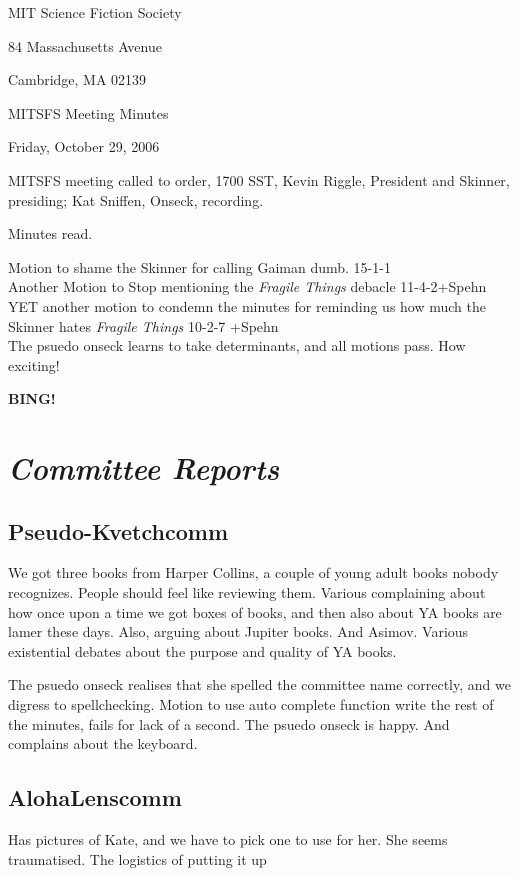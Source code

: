 \documentclass[10pt]{article}
\newcommand{\bing}{{\bf BING!} }
\newcommand{\goto}[1]{\bing \vskip 12pt \section*{{\em{#1}}}}
\begin{document}
\begin{center}

MIT Science Fiction Society

84 Massachusetts Avenue

Cambridge, MA 02139

\vspace{12pt}

MITSFS Meeting Minutes

Friday, October 29, 2006

\end{center}

\vspace{18pt}

\setlength{\parskip}{6pt}

\noindent
MITSFS meeting called to order, 1700 SST,
Kevin Riggle, President and Skinner, presiding; Kat Sniffen, Onseck, recording.

Minutes read.


Motion to shame the Skinner for calling Gaiman dumb.  15-1-1\\
Another Motion to Stop mentioning the \emph{Fragile Things} debacle 11-4-2+Spehn \\
YET another motion to condemn the minutes for reminding us how much the Skinner hates \emph{Fragile Things} 10-2-7 +Spehn \\
The psuedo onseck learns to take determinants, and all motions pass. How exciting!


\goto{Committee Reports}

\subsection*{Pseudo-Kvetchcomm}
We got three books from Harper Collins, a couple of young adult books nobody recognizes. People should feel like reviewing them.
Various complaining about how once upon a time we got boxes of books, and then also about YA books are lamer these days.
Also, arguing about Jupiter books. And Asimov. Various existential debates about the purpose and quality of YA books.

The psuedo onseck realises that she spelled the committee name correctly, and we digress to spellchecking.
Motion to use auto complete function write the rest of the minutes, fails for lack of a second. The psuedo onseck is happy. And complains about the keyboard.

\subsection*{AlohaLenscomm}
Has pictures of Kate, and we have to pick one  to use for her. She seems traumatised. The logistics of putting it up 
\end{document}
